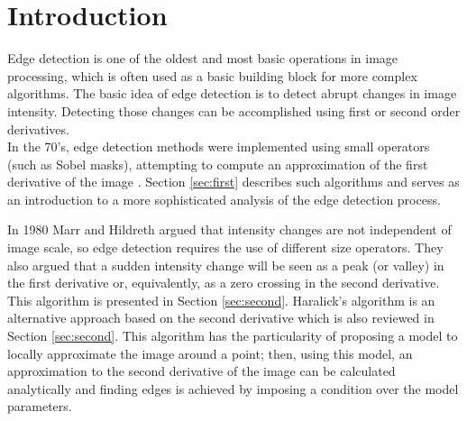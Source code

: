 \documentclass{ipol}
\numberwithin{equation}{section}
\numberwithin{table}{section}
\begin{document}




\section{Introduction}
\label{sec:intro}

Edge detection is one of the oldest and most basic operations in image processing, which is often used as a basic building block for more complex algorithms. The basic idea of edge detection is to detect abrupt changes in image intensity. 
Detecting those changes can be accomplished using first or second order derivatives. \\

In the 70's, edge detection methods were implemented using small operators 
(such as Sobel masks), attempting to compute an approximation of the
first derivative of the image \cite{Gonzalez2007Digital}. Section \ref{sec:first} describes such algorithms 
and serves as an introduction to a more sophisticated 
analysis of the edge detection process.

In 1980 Marr and Hildreth \cite{segm:edge_region:marr:84:digital_step} argued that intensity changes are not independent 
of image scale, so edge detection requires the use of different size 
operators. They also argued that a sudden intensity change will be seen 
as a peak (or valley) in the first derivative or, equivalently, as a zero 
crossing in the second derivative. This algorithm is presented in Section \ref{sec:second}. 
Haralick's algorithm \cite{bb20239} is an alternative approach based on the second derivative 
which is also reviewed in Section \ref{sec:second}. This algorithm has the particularity of 
proposing a model to locally approximate the image around a point; then, using this model, 
an approximation to the second derivative of the image can be calculated analytically and 
finding edges is achieved by imposing a condition over the model parameters. 
\end{document}
